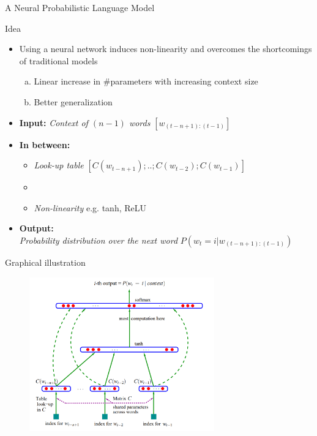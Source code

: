 \begin{frame}{A Neural Probabilistic Language Model}

\vfill

\begin{block}{Idea}
        \begin{itemize}
        \item Using a neural network induces non-linearity and overcomes the shortcomings of traditional models
        \begin{enumerate}[(a)]
            \item Linear increase in $\#$parameters with increasing context size
            \item Better generalization
        \end{enumerate}
        \item \textbf{Input:} {\it Context of $(n-1)$ words} \hfill $[w_{(t-n+1):(t-1)}]$
        \item \textbf{In between:} 
        \begin{itemize}
            \item {\it Look-up table} \hfill $[C(w_{t-n+1}); .. ; C(w_{t-2}); C(w_{t-1})]$
            \item[]
            \item {\it Non-linearity} \hfill e.g. tanh, ReLU
        \end{itemize}
        \item \textbf{Output:}\\{\it Probability distribution over the next word} \hfill $P(w_t = i|w_{(t-n+1):(t-1)})$
        \end{itemize}
\end{block}

\vfill

\end{frame}


\begin{frame}{Graphical illustration}

\vfill

\begin{figure}
    \centering
    \includegraphics[width=8cm]{figure/bengio03.png}\\
\end{figure}

\vfill

\end{frame}

